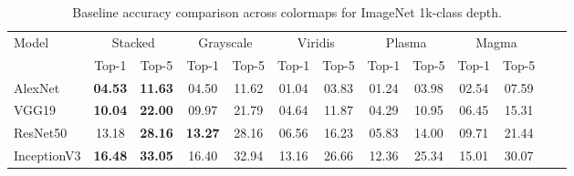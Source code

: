 \begin{table}[htbp]
    \centering
    \begin{tabular}{|l|c|c|c|c|c|c|c|c|c|c|c|c|}
        \hline
        \multirow{2}{*}{Model} & \multicolumn{2}{|c|}{Stacked} & \multicolumn{2}{|c|}{Grayscale} & \multicolumn{2}{|c|}{Viridis} & \multicolumn{2}{|c|}{Plasma} & \multicolumn{2}{|c|}{Magma} \\
        \cline{2-11}
         & Top-1 & Top-5 & Top-1 & Top-5 & Top-1 & Top-5 & Top-1 & Top-5 & Top-1 & Top-5 \\
        \hline
        AlexNet & \textbf{04.53} & \textbf{11.63} & 04.50 & 11.62 & 01.04 & 03.83 & 01.24 & 03.98 & 02.54 & 07.59 \\
        \hline
        VGG19 & \textbf{10.04} & \textbf{22.00} & 09.97 & 21.79 & 04.64 & 11.87 & 04.29 & 10.95 & 06.45 & 15.31 \\
        \hline
        ResNet50 & 13.18 & \textbf{28.16} & \textbf{13.27} & 28.16 & 06.56 & 16.23 & 05.83 & 14.00 & 09.71 & 21.44 \\
        \hline
        InceptionV3 & \textbf{16.48} & \textbf{33.05} & 16.40 & 32.94 & 13.16 & 26.66 & 12.36 & 25.34 & 15.01 & 30.07 \\
        \hline
    \end{tabular}
    \caption{Baseline accuracy comparison across colormaps for ImageNet 1k-class depth.}
    \label{tab:baseline_accuracy}
\end{table}

